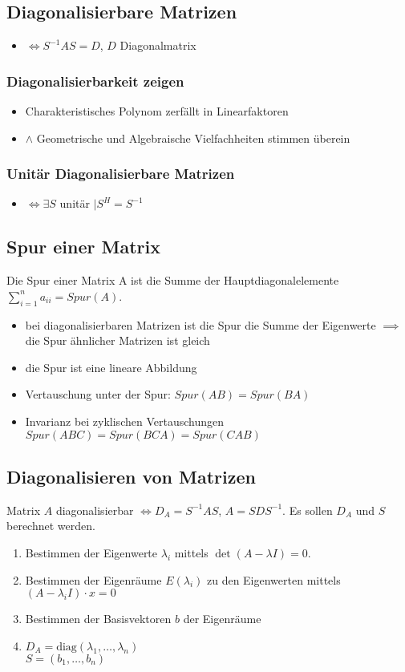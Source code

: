 \documentclass[a4paper]{article}
\begin{document}
\subsection{Diagonalisierbare Matrizen}
\begin{itemize}
    \item $\iff S^{-1}AS = D$, $D$ Diagonalmatrix
\end{itemize}
\subsubsection{Diagonalisierbarkeit zeigen}
\begin{itemize}
    \item Charakteristisches Polynom zerfällt in Linearfaktoren
    \item $\wedge$ Geometrische und Algebraische Vielfachheiten stimmen überein
\end{itemize}

\subsubsection{Unitär Diagonalisierbare Matrizen}
\begin{itemize}
    \item $\iff \exists S$ unitär $\mid S^H=S^{-1}$
\end{itemize}

\subsection{Spur einer Matrix}
Die Spur einer Matrix A ist die Summe der Hauptdiagonalelemente\\ $\sum\nolimits_{i=1}^n a_{ii} = Spur(A)$.
\begin{itemize}
    \item bei diagonalisierbaren Matrizen ist die Spur die Summe der Eigenwerte $\implies$ die Spur ähnlicher Matrizen ist gleich
    \item die Spur ist eine lineare Abbildung
    \item Vertauschung unter der Spur: $Spur(AB)=Spur(BA)$
    \item Invarianz bei zyklischen Vertauschungen $Spur(ABC)=Spur(BCA)=Spur(CAB)$
\end{itemize}

\subsection{Diagonalisieren von Matrizen}
Matrix $A$ diagonalisierbar $\iff D_A=S^{-1}AS$, $A=SDS^{-1}$. Es sollen $D_A$ und $S$ berechnet werden.
\begin{enumerate}
    \item Bestimmen der Eigenwerte $\lambda_i$ mittels $\det(A-\lambda I) = 0$.
    \item Bestimmen der Eigenräume $E(\lambda_i)$ zu den Eigenwerten mittels $(A-\lambda_iI)\cdot x = 0$
    \item Bestimmen der Basisvektoren $b$ der Eigenräume
    \item $D_A = \text{diag}(\lambda_1,\dots , \lambda_n)$\\ $S=(b_1,\dots,b_n)$
\end{enumerate}
\end{document}
